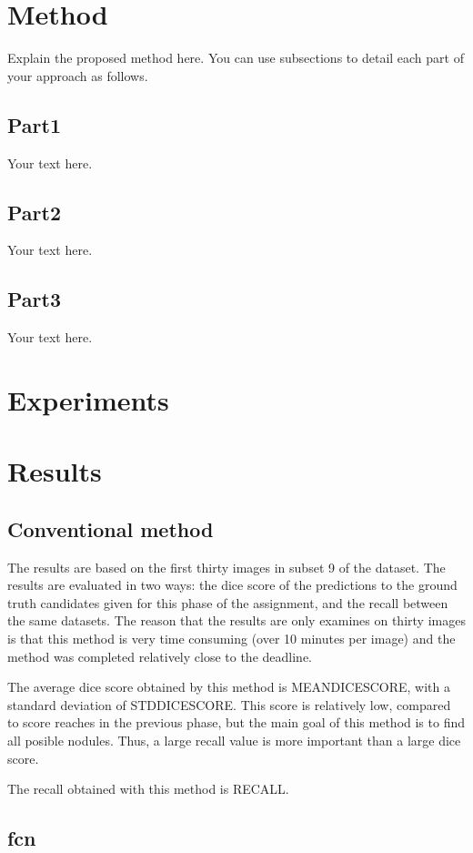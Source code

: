 \documentclass{article}
\begin{document}
\section{Method}\label{sec:method}
Explain the proposed method here.
You can use subsections to detail each part of your approach as follows. 
\subsection{Part1}
Your text here.

\subsection{Part2}
Your text here.

\subsection{Part3}
Your text here.

\section{Experiments}\label{sec:experiments}


\section{Results}\label{sec:results}
\subsection{Conventional method}
The results are based on the first thirty images in subset 9 of the dataset. The results are evaluated in two ways: the dice score of the predictions to the ground truth candidates given for this phase of the assignment, and the recall between the same datasets. The reason that the results are only examines on thirty images is that this method is very time consuming (over 10 minutes per image) and the method was completed relatively close to the deadline.

The average dice score obtained by this method is MEANDICESCORE, with a standard deviation of STDDICESCORE. This score is relatively low, compared to score reaches in the previous phase, but the main goal of this method is to find all posible nodules. Thus, a large recall value is more important than a large dice score.

The recall obtained with this method is RECALL.
\subsection{fcn}
\end{document}
